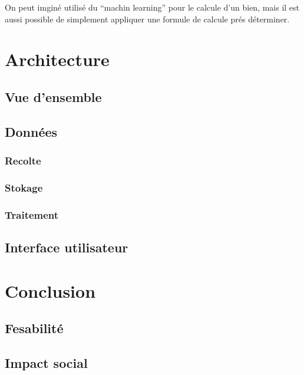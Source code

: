 \documentclass[12pt]{report}
\begin{document}
On peut imginé utilisé du ``machin learning'' pour le calcule d'un bien, mais
il est aussi possible de simplement appliquer une formule de calcule prés
déterminer.

\chapter{Architecture}
\section{Vue d'ensemble}
\section{Données}
\subsection{Recolte}
\subsection{Stokage}
\subsection{Traitement}
\section{Interface utilisateur}

\chapter{Conclusion}
\section{Fesabilité}
\section{Impact social}
\end{document}
